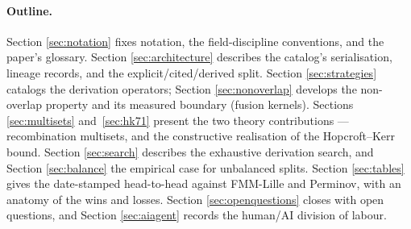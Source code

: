 \paragraph{Outline.} Section \ref{sec:notation} fixes notation, the
field-discipline conventions, and the paper's glossary. Section
\ref{sec:architecture} describes the catalog's serialisation, lineage
records, and the explicit/cited/derived split. Section
\ref{sec:strategies} catalogs the derivation operators; Section
\ref{sec:nonoverlap} develops the non-overlap property and its
measured boundary (fusion kernels). Sections \ref{sec:multisets}
and~\ref{sec:hk71} present the two theory contributions ---
recombination multisets, and the constructive realisation of the
Hopcroft--Kerr bound. Section \ref{sec:search} describes the
exhaustive derivation search, and Section \ref{sec:balance} the empirical
case for unbalanced splits. Section \ref{sec:tables} gives the
date-stamped head-to-head against FMM-Lille and Perminov, with an
anatomy of the wins and losses. Section \ref{sec:openquestions}
closes with open questions, and Section \ref{sec:aiagent} records the
human/AI division of labour.
